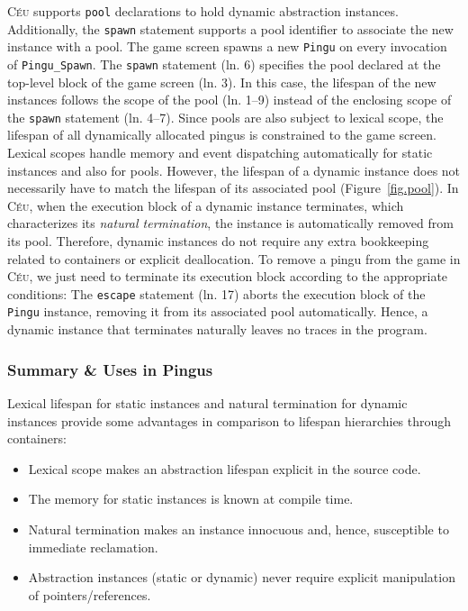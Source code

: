 \documentclass{vgtc}                          %
\newcommand{\CEU}{\textsc{C\'{e}u}\xspace}
\newcommand{\code}[1] {{\small{\texttt{#1}}}}
\begin{document}
\CEU supports \code{pool} declarations to hold dynamic abstraction instances.
Additionally, the \code{spawn} statement supports a pool identifier to
associate the new instance with a pool.
%
The game screen spawns a new \code{Pingu} on every invocation of
\code{Pingu\_Spawn}.
%
The \code{spawn} statement (ln. 6) specifies the pool declared at the top-level
block of the game screen (ln. 3).
In this case, the lifespan of the new instances follows the scope of the pool
(ln. 1--9) instead of the enclosing scope of the \code{spawn} statement
(ln. 4--7).
Since pools are also subject to lexical scope, the lifespan of all dynamically
allocated pingus is constrained to the game screen.
%
Lexical scopes handle memory and event dispatching automatically for static
instances and also for pools.
However, the lifespan of a dynamic instance does not necessarily have to match
the lifespan of its associated pool (Figure~\ref{fig.pool}).
In \CEU, when the execution block of a dynamic instance terminates, which
characterizes its \emph{natural termination}, the instance is automatically
removed from its pool.
Therefore, dynamic instances do not require any extra bookkeeping related to 
containers or explicit deallocation.
%
To remove a pingu from the game in \CEU, we just need to terminate its execution
block according to the appropriate conditions:
%
The \code{escape} statement (ln. 17) aborts the execution block of the
\code{Pingu} instance, removing it from its associated pool automatically.
Hence, a dynamic instance that terminates naturally leaves no traces in the 
program.

\subsubsection{Summary \& Uses in Pingus}

Lexical lifespan for static instances and natural termination for dynamic
instances provide some advantages in comparison to lifespan hierarchies through
containers:

\begin{itemize}
\item Lexical scope makes an abstraction lifespan explicit in the source code.
\item The memory for static instances is known at compile time.
\item Natural termination makes an instance innocuous and, hence, susceptible
      to immediate reclamation.
\item Abstraction instances (static or dynamic) never require explicit
      manipulation of pointers/references.
\end{itemize}
\end{document}
